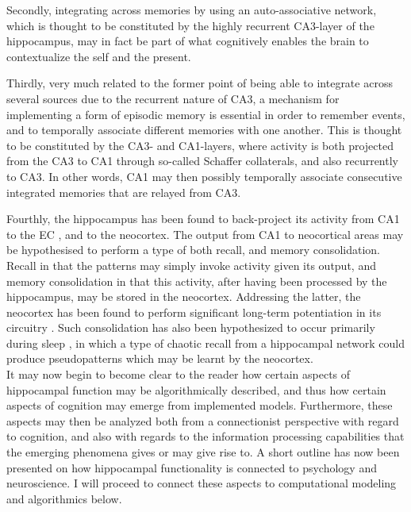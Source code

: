 Secondly, integrating across memories by using an auto-associative network, which is thought to be constituted by the highly recurrent CA3-layer of the hippocampus, may in fact be part of what cognitively enables the brain to contextualize the self and the present.

Thirdly, very much related to the former point of being able to integrate across several sources due to the recurrent nature of CA3, a mechanism for implementing a form of episodic memory is essential in order to remember events, and to temporally associate different memories with one another. This is thought to be constituted by the CA3- and CA1-layers, where activity is both projected from the CA3 to CA1 through so-called Schaffer collaterals, and also recurrently to CA3. In other words, CA1 may then possibly temporally associate consecutive integrated memories that are relayed from CA3.

Fourthly, the hippocampus has been found to back-project its activity from CA1 to the EC \citep{Rolls1998chpt6}, and to the neocortex. The output from CA1 to neocortical areas may be hypothesised to perform a type of both recall, and memory consolidation. Recall in that the patterns may simply invoke activity given its output, and memory consolidation in that this activity, after having been processed by the hippocampus, may be stored in the neocortex. Addressing the latter, the neocortex has been found to perform significant long-term potentiation in its circuitry \citep{Rolls1998chpt6}. Such consolidation has also been hypothesized to occur primarily during sleep \citep{French2001}, in which a type of chaotic recall from a hippocampal network could produce pseudopatterns which may be learnt by the neocortex.
\\


It may now begin to become clear to the reader how certain aspects of hippocampal function may be algorithmically described, and thus how certain aspects of cognition may emerge from implemented models. Furthermore, these aspects may then be analyzed both from a connectionist perspective with regard to cognition, and also with regards to the information processing capabilities that the emerging phenomena gives or may give rise to. A short outline has now been presented on how hippocampal functionality is connected to psychology and neuroscience. I will proceed to connect these aspects to computational modeling and algorithmics below.

